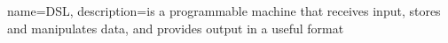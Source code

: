 
{
  name=DSL,
  description={is a programmable machine that receives input,
               stores and manipulates data, and provides
               output in a useful format}
}
